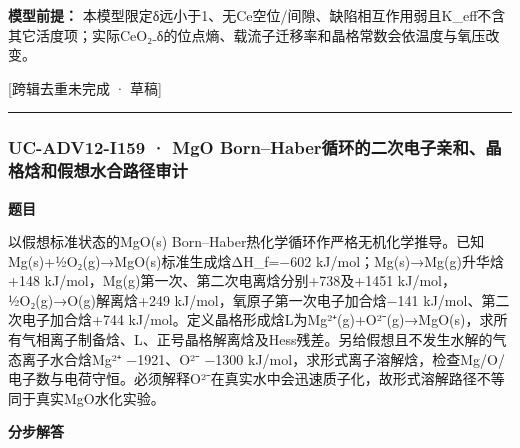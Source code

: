\documentclass[UTF8,11pt,a4paper]{ctexart}
\begin{document}
\noindent\textbf{模型前提：}
本模型限定δ远小于1、无Ce空位/间隙、缺陷相互作用弱且K\_eff不含其它活度项；实际CeO₂₋δ的位点熵、载流子迁移率和晶格常数会依温度与氧压改变。\par
\noindent\textcolor{red!65!black}{[跨辑去重未完成 · 草稿]} \par
\medskip\hrule\medskip
{}
\subsubsection*{UC-ADV12-I159 · MgO Born–Haber循环的二次电子亲和、晶格焓和假想水合路径审计}
\noindent\textbf{题目}\par
以假想标准状态的MgO(s) Born–Haber热化学循环作严格无机化学推导。已知Mg(s)+½O₂(g)→MgO(s)标准生成焓ΔH\_f=−602 kJ/mol；Mg(s)→Mg(g)升华焓+148 kJ/mol，Mg(g)第一次、第二次电离焓分别+738及+1451 kJ/mol，½O₂(g)→O(g)解离焓+249 kJ/mol，氧原子第一次电子加合焓−141 kJ/mol、第二次电子加合焓+744 kJ/mol。定义晶格形成焓L为Mg²⁺(g)+O²⁻(g)→MgO(s)，求所有气相离子制备焓、L、正号晶格解离焓及Hess残差。另给假想且不发生水解的气态离子水合焓Mg²⁺ −1921、O²⁻ −1300 kJ/mol，求形式离子溶解焓，检查Mg/O/电子数与电荷守恒。必须解释O²⁻在真实水中会迅速质子化，故形式溶解路径不等同于真实MgO水化实验。\par
\medskip\noindent\textbf{分步解答}
\end{document}
